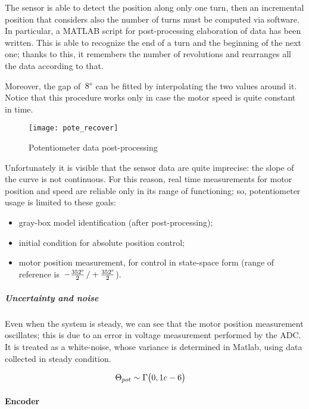 The sensor is able to detect the position along only one turn, then an incremental position that considers also the number of turns must be computed via software.
In particular, a MATLAB script for post-processing elaboration of data has been written. This is able to recognize the end of a turn and the beginning of the next one; thanks to this, it remembers the number of revolutions and rearranges all the data according to that.

Moreover, the gap of~$8 \degree$ can be fitted by interpolating the two values around it. Notice that this procedure works only in case the motor speed is quite constant in time.
\begin{figure*}[h]
	\centering
	\texttt{[image: pote\_recover]}
	\caption{Potentiometer data post-processing}
\end{figure*}

Unfortunately it is visible that the sensor data are quite imprecise: the slope of the curve is not continuous. For this reason, real time measurements for motor position and speed are reliable only in its range of functioning; so, potentiometer usage is limited to these goals:

\begin{itemize}
	\item gray-box model identification (after post-processing);
	\item initial condition for absolute position control;
	\item motor position measurement, for control in state-space form (range of reference is~$-\frac{352 \degree}{2} \, / +\frac{352 \degree}{2}$).
\end{itemize}

\subparagraph{Uncertainty and noise}
Even when the system is steady, we can see that the motor position measurement oscillates; this is due to an error in voltage measurement performed by the ADC. It is treated as a white-noise, whose variance is determined in Matlab, using data collected in steady condition.

\begin{align*}
	\Theta_{pot} &\sim \Gamma \bigl{(} 0, 1e-6 \bigr{)}
\end{align*}

\paragraph{Encoder}


